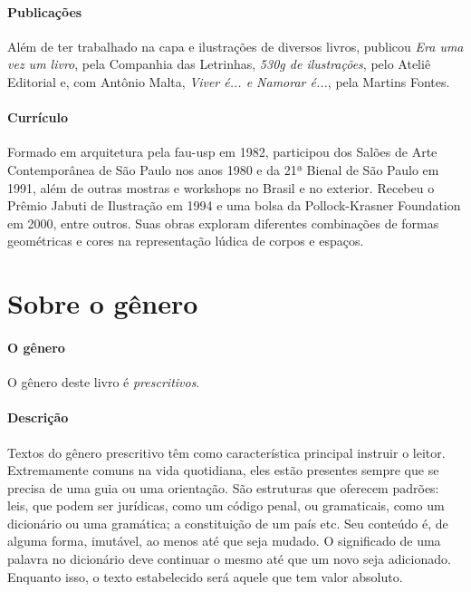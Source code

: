 \documentclass[11pt]{extarticle}
\begin{document}
\paragraph{Publicações} 
Além de ter trabalhado na capa e ilustrações de diversos livros, 
publicou \emph{Era uma vez um livro}, pela Companhia das Letrinhas, \emph{530g de ilustrações}, pelo Ateliê Editorial e, com Antônio Malta, \emph{Viver é... e Namorar é...}, pela Martins Fontes.
\paragraph{Currículo} 
Formado em arquitetura pela fau-usp em 1982, participou dos Salões de Arte 
Contemporânea de São Paulo nos anos 1980 e da 21ª Bienal de São Paulo em 1991, 
além de outras mostras e workshops no Brasil e no exterior. Recebeu o Prêmio 
Jabuti de Ilustração em 1994 e uma bolsa da Pollock-Krasner Foundation em 2000, 
entre outros. Suas obras exploram diferentes combinações de formas geométricas 
e cores na representação lúdica de corpos e espaços.


\section{Sobre o gênero}

\paragraph{O gênero} O gênero deste livro é \textit{prescritivos}. 


\paragraph{Descrição} 
Textos do gênero prescritivo têm como característica principal instruir
o leitor. Extremamente comuns na vida quotidiana, eles estão presentes
sempre que se precisa de uma guia ou uma orientação. São estruturas 
que oferecem padrões: leis, que podem ser jurídicas, como um código
penal, ou gramaticais, como um dicionário ou uma gramática; a constituição
de um país etc. Seu conteúdo é, de alguma forma, imutável, ao menos até que seja
mudado. O significado de uma palavra no dicionário deve continuar o mesmo
até que um novo seja adicionado. Enquanto isso, o texto
estabelecido será aquele que tem valor absoluto.
\end{document}
